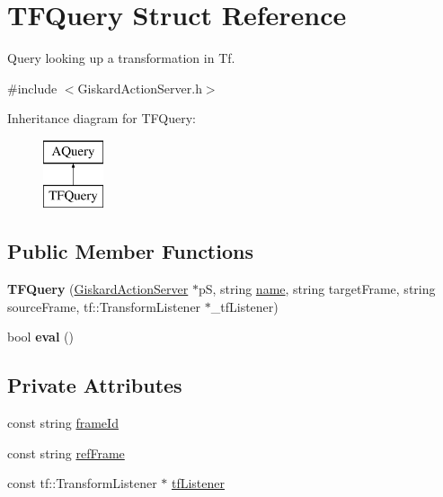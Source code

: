 \hypertarget{structTFQuery}{\section{T\-F\-Query Struct Reference}
\label{structTFQuery}
}


Query looking up a transformation in Tf.  




{\ttfamily \#include $<$Giskard\-Action\-Server.\-h$>$}

Inheritance diagram for T\-F\-Query\-:\begin{figure}[H]
\begin{center}
\leavevmode
\includegraphics[height=2.000000cm]{structTFQuery}
\end{center}
\end{figure}
\subsection*{Public Member Functions}
\begin{DoxyCompactItemize}
\item 
\hypertarget{structTFQuery_a065412ea50cfcbab8fde438e6dce7d0d}{{\bfseries T\-F\-Query} (\hyperlink{classGiskardActionServer}{Giskard\-Action\-Server} $\ast$p\-S, string \hyperlink{structAQuery_a209eec59fbdf038ec7de39db059ddaa4}{name}, string target\-Frame, string source\-Frame, tf\-::\-Transform\-Listener $\ast$\-\_\-tf\-Listener)}\label{structTFQuery_a065412ea50cfcbab8fde438e6dce7d0d}

\item 
\hypertarget{structTFQuery_aa666ac37934e7e3291bf45094dde9aa2}{bool {\bfseries eval} ()}\label{structTFQuery_aa666ac37934e7e3291bf45094dde9aa2}

\end{DoxyCompactItemize}
\subsection*{Private Attributes}
\begin{DoxyCompactItemize}
\item 
const string \hyperlink{structTFQuery_a1827c7ca85239f98da28cb9bebf630bb}{frame\-Id}
\item 
const string \hyperlink{structTFQuery_aa5198bb657f18acf54ca14f5f2e77728}{ref\-Frame}
\item 
const tf\-::\-Transform\-Listener $\ast$ \hyperlink{structTFQuery_af963e7f338115d80baa86aeea7bd7570}{tf\-Listener}
\end{DoxyCompactItemize}
